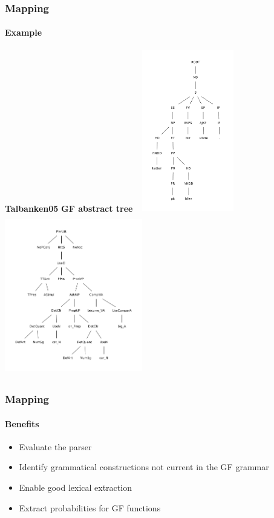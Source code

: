 \documentclass[10pt]{beamer}
\begin{document}
\begin{frame}
\frametitle{Mapping}
\framesubtitle{Example} 
\small{\textbf{Talbanken05}}\hspace{160pt}
\small{\textbf{GF abstract tree}}
\includegraphics[width=130pt,height=200pt]{taltree.pdf}
\includegraphics[width=170pt,height=200pt]{gftree.pdf}
\end{frame}

%
\begin{frame}

\frametitle{Mapping}
\framesubtitle{Benefits} 
\begin{itemize}
\item{Evaluate the parser}
\pause
\item{Identify grammatical constructions not current in the GF grammar}
\pause
\item{Enable good lexical extraction}
\pause
\item{Extract probabilities for GF functions}
\end{itemize}
\end{frame}
\end{document}
